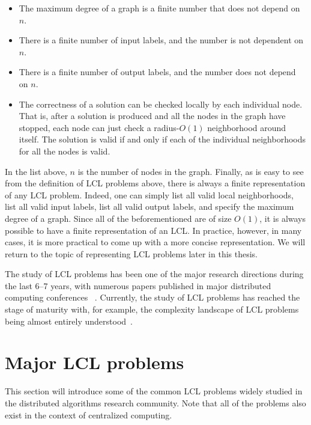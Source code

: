 \begin{itemize}

\item The maximum degree of a graph is a finite number that does not depend on $n$.

\item There is a finite number of input labels, and the number is not dependent on $n$.

\item There is a finite number of output labels, and the number does not depend on $n$.

\item The correctness of a solution can be checked locally by each individual node. That is,
after a solution is produced and all the nodes in the graph have stopped, each node can just
check a radius-$O(1)$ neighborhood around itself. The solution is valid if and only if each of
the individual neighborhoods for all the nodes is valid.

\end{itemize}
In the list above, $n$ is the number of nodes in the graph. Finally, as is easy to see from the definition of LCL
problems
above, there is always a finite representation of any LCL problem. Indeed, one can simply list
all valid local neighborhoods, list all valid input labels, list all valid output
labels, and specify the maximum degree of a graph. Since all of the beforementioned are
of size $O(1)$, it is always possible to have a finite representation of an LCL.
In practice, however, in many cases, it is more practical to come up with
a more concise representation. We will return to the topic of representing LCL
problems later in this thesis.

The study of LCL problems has been one of the major research directions
during the last 6--7 years, with numerous papers published in major
distributed computing conferences
~\cite{Balliu2016, Chang2016, Brandt2017, Chang2017, Fischer2017a, Rozhon2019, Balliu2020-1, Balliu2020-2}.
Currently, the study of LCL problems has reached the stage of maturity with,
for example, the complexity landscape of LCL problems being
almost entirely understood~\cite{Suomela2020, Chang2020a}.

\section{Major LCL problems}

This section will introduce some of the common LCL problems
widely studied in the distributed algorithms research community.
Note that all of the problems also exist in the context of 
centralized computing.

